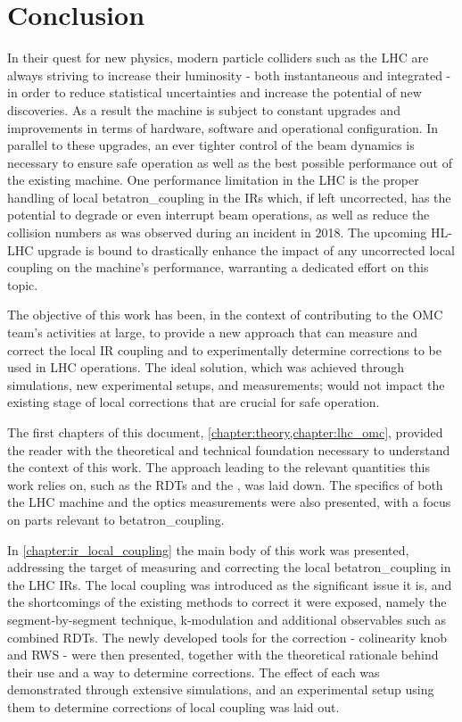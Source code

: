 \chapter{Conclusion}
\label{chapter:conclusion}

In their quest for new physics, modern particle colliders such as the \gls{LHC} are always striving to increase their \gls{luminosity} - both instantaneous and integrated - in order to reduce statistical uncertainties and increase the potential of new discoveries.
As a result the machine is subject to constant upgrades and improvements in terms of hardware, software and operational configuration.
In parallel to these upgrades, an ever tighter control of the \gls{beam} dynamics is necessary to ensure safe operation as well as the best possible performance out of the existing machine.
One performance limitation in the \gls{LHC} is the proper handling of local \gls{betatron_coupling} in the \glspl{IR} which, if left uncorrected, has the potential to degrade or even interrupt beam operations, as well as reduce the collision numbers as was observed during an incident in \num{2018}.
The upcoming \gls{HL-LHC} upgrade is bound to drastically enhance the impact of any uncorrected local coupling on the machine's performance, warranting a dedicated effort on this topic.

The objective of this work has been, in the context of contributing to the \gls{OMC} team's activities at large, to provide a new approach that can measure and correct the local \gls{IR} coupling and to experimentally determine corrections to be used in LHC operations.
The ideal solution, which was achieved through simulations, new experimental setups, and measurements; would not impact the existing stage of local corrections that are crucial for safe operation.
\break 

The first chapters of this document, \cref{chapter:theory,chapter:lhc_omc}, provided the reader with the theoretical and technical foundation necessary to understand the context of this work.
The approach leading to the relevant quantities this work relies on, such as the \glspl{RDT} and the , was laid down.
The specifics of both the \gls{LHC} machine and the \gls{optics} measurements were also presented, with a focus on parts relevant to \gls{betatron_coupling}.
\break 

In \cref{chapter:ir_local_coupling} the main body of this work was presented, addressing the target of measuring and correcting the local \gls{betatron_coupling} in the LHC \glspl{IR}.
The local coupling was introduced as the significant issue it is, and the shortcomings of the existing methods to correct it were exposed, namely the segment-by-segment technique, k-modulation and additional observables such as combined \glspl{RDT}.
The newly developed tools for the correction - colinearity knob and \gls{RWS} - were then presented, together with the theoretical rationale behind their use and a way to determine corrections.
The effect of each was demonstrated through extensive simulations, and an experimental setup using them to determine corrections of local coupling was laid out.

